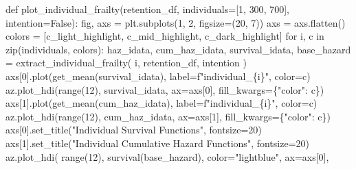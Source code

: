 \documentclass[
  letterpaper,
  DIV=11,
  numbers=noendperiod]{scrartcl}
\newenvironment{Shaded}{\begin{snugshade}}{\end{snugshade}}
\newcommand{\BuiltInTok}[1]{\textcolor[rgb]{0.00,0.23,0.31}{#1}}
\newcommand{\ControlFlowTok}[1]{\textcolor[rgb]{0.00,0.23,0.31}{#1}}
\newcommand{\DecValTok}[1]{\textcolor[rgb]{0.68,0.00,0.00}{#1}}
\newcommand{\KeywordTok}[1]{\textcolor[rgb]{0.00,0.23,0.31}{#1}}
\newcommand{\NormalTok}[1]{\textcolor[rgb]{0.00,0.23,0.31}{#1}}
\newcommand{\OperatorTok}[1]{\textcolor[rgb]{0.37,0.37,0.37}{#1}}
\newcommand{\SpecialCharTok}[1]{\textcolor[rgb]{0.37,0.37,0.37}{#1}}
\newcommand{\SpecialStringTok}[1]{\textcolor[rgb]{0.13,0.47,0.30}{#1}}
\newcommand{\StringTok}[1]{\textcolor[rgb]{0.13,0.47,0.30}{#1}}
\newcommand{\VariableTok}[1]{\textcolor[rgb]{0.07,0.07,0.07}{#1}}
\begin{document}
\begin{Shaded}
\begin{Highlighting}[]
\KeywordTok{def}\NormalTok{ plot\_individual\_frailty(retention\_df, individuals}\OperatorTok{=}\NormalTok{[}\DecValTok{1}\NormalTok{, }\DecValTok{300}\NormalTok{, }\DecValTok{700}\NormalTok{], intention}\OperatorTok{=}\VariableTok{False}\NormalTok{):}
\NormalTok{    fig, axs }\OperatorTok{=}\NormalTok{ plt.subplots(}\DecValTok{1}\NormalTok{, }\DecValTok{2}\NormalTok{, figsize}\OperatorTok{=}\NormalTok{(}\DecValTok{20}\NormalTok{, }\DecValTok{7}\NormalTok{))}
\NormalTok{    axs }\OperatorTok{=}\NormalTok{ axs.flatten()}
\NormalTok{    colors }\OperatorTok{=}\NormalTok{ [c\_light\_highlight, c\_mid\_highlight, c\_dark\_highlight]}
    \ControlFlowTok{for}\NormalTok{ i, c }\KeywordTok{in} \BuiltInTok{zip}\NormalTok{(individuals, colors):}
\NormalTok{        haz\_idata, cum\_haz\_idata, survival\_idata, base\_hazard }\OperatorTok{=}\NormalTok{ extract\_individual\_frailty(}
\NormalTok{            i, retention\_df, intention}
\NormalTok{        )}
\NormalTok{        axs[}\DecValTok{0}\NormalTok{].plot(get\_mean(survival\_idata), label}\OperatorTok{=}\SpecialStringTok{f"individual\_}\SpecialCharTok{\{}\NormalTok{i}\SpecialCharTok{\}}\SpecialStringTok{"}\NormalTok{, color}\OperatorTok{=}\NormalTok{c)}
\NormalTok{        az.plot\_hdi(}\BuiltInTok{range}\NormalTok{(}\DecValTok{12}\NormalTok{), survival\_idata, ax}\OperatorTok{=}\NormalTok{axs[}\DecValTok{0}\NormalTok{], fill\_kwargs}\OperatorTok{=}\NormalTok{\{}\StringTok{"color"}\NormalTok{: c\})}
\NormalTok{        axs[}\DecValTok{1}\NormalTok{].plot(get\_mean(cum\_haz\_idata), label}\OperatorTok{=}\SpecialStringTok{f"individual\_}\SpecialCharTok{\{}\NormalTok{i}\SpecialCharTok{\}}\SpecialStringTok{"}\NormalTok{, color}\OperatorTok{=}\NormalTok{c)}
\NormalTok{        az.plot\_hdi(}\BuiltInTok{range}\NormalTok{(}\DecValTok{12}\NormalTok{), cum\_haz\_idata, ax}\OperatorTok{=}\NormalTok{axs[}\DecValTok{1}\NormalTok{], fill\_kwargs}\OperatorTok{=}\NormalTok{\{}\StringTok{"color"}\NormalTok{: c\})}
\NormalTok{        axs[}\DecValTok{0}\NormalTok{].set\_title(}\StringTok{"Individual Survival Functions"}\NormalTok{, fontsize}\OperatorTok{=}\DecValTok{20}\NormalTok{)}
\NormalTok{        axs[}\DecValTok{1}\NormalTok{].set\_title(}\StringTok{"Individual Cumulative Hazard Functions"}\NormalTok{, fontsize}\OperatorTok{=}\DecValTok{20}\NormalTok{)}
\NormalTok{    az.plot\_hdi(}
        \BuiltInTok{range}\NormalTok{(}\DecValTok{12}\NormalTok{),}
\NormalTok{        survival(base\_hazard),}
\NormalTok{        color}\OperatorTok{=}\StringTok{"lightblue"}\NormalTok{,}
\NormalTok{        ax}\OperatorTok{=}\NormalTok{axs[}\DecValTok{0}\NormalTok{],}

\end{Highlighting}
\end{Shaded}
\end{document}
